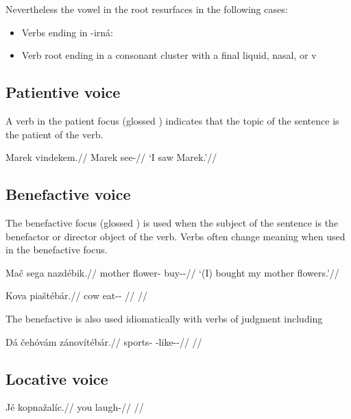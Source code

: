 Nevertheless the vowel  in the root resurfaces in the following cases:

\begin{itemize}
	\item Verbs ending in -irná:
	\item Verb root ending in a consonant cluster with a final liquid, nasal, or v
\end{itemize}

\subsection{Patientive voice}
\par A verb in the patient focus (glossed \Pat{}) indicates that the topic of the sentence is the patient of the verb.

\pex
\begingl
\gla Marek vindekem.//
\glb Marek see-//
\glft `I saw Marek.'//
\endgl
\xe


\subsection{Benefactive voice}
\par The benefactive focus (glossed ) is used when the subject of the sentence is the benefactor or director object of the verb. Verbs often change meaning when used in the benefactive focus.


\begin{multicols}{2}
\pex
\begingl
\gla Mač sega nazdébik.//
\glb mother flower-\Pat{} buy-\Ben{}-\Pf{}//
\glft `(I) bought my mother flowers.'//
\endgl
\xe

\pex
\begingl
\gla Kova piaštéb\'ar.//
\glb cow eat-\Ben{}-\Prog{} //
\glft {}//
\endgl
\xe

\end{multicols}

The benefactive is also used idiomatically with verbs of judgment including  

\pex
\begingl
\gla Dá čehóvám zánovítébár.//
\glb \First\Sg{} sports-\Agt{} \Neg{}-like-\Ben{}-\Prog{}//
\glft {}//
\endgl
\xe

\subsection{Locative voice}

\pex
\begingl
\gla Jé kopnažalíc.//
\glb you laugh-//
\glft {}//
\endgl
\xe

